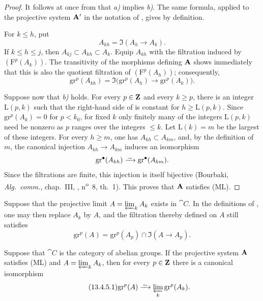 \begin{proof}
It follows at once from  that \emph{a)} implies
\emph{b)}. The same formula, applied to the projective system
$\mathbf{A}'$ in the notation of , gives
 by definition.

For $k\leq h$, put
\[
  A_{kh}=\Im(A_h\longrightarrow A_k).
\]
If $k\leq h\leq j$, then
$A_{kj}\subset A_{kh}\subset A_k$.
Equip $A_{kh}$ with the filtration induced by
$(\mathrm{F}^p(A_k))$.
The transitivity of the morphisms defining $\mathbf{A}$ shows
immediately that this is also the quotient filtration of
$(\mathrm{F}^p(A_h))$; consequently,
\begin{equation}
\label{0.13.4.3.2}
\tag{13.4.3.2}
  \mathrm{gr}^p(A_{kh})
  =
  \Im\bigl(
    \mathrm{gr}^p(A_h)\longrightarrow\mathrm{gr}^p(A_k)
  \bigr).
\end{equation}

Suppose now that \emph{b)} holds.
For every $p\in\mathbf{Z}$ and every $k\geq p$, there is an integer
$\mathrm{L}(p,k)$ such that the right-hand side of
 is constant for $h\geq\mathrm{L}(p,k)$.
Since $\mathrm{gr}^p(A_k)=0$ for $p<k_0$, for fixed $k$ only
finitely many of the integers $\mathrm{L}(p,k)$ need be nonzero as
$p$ ranges over the integers $\leq k$.
Let $\mathrm{L}(k)=m$ be the largest of these integers.
For every $h\geq m$, one has
$A_{kh}\subset A_{km}$, and, by the definition of $m$, the canonical
injection
$A_{kh}\longrightarrow A_{km}$ induces an isomorphism
\[
  \mathrm{gr}^\bullet(A_{kh})
  \simto
  \mathrm{gr}^\bullet(A_{km}).
\]
Since the filtrations are finite, this injection is itself bijective
(Bourbaki, \emph{Alg.\ comm.}, chap.~III, ,
n\textsuperscript{o}~8, th.~1).
This proves that $\mathbf{A}$ satisfies (ML).
\end{proof}

\begin{env}[13.4.4]
\label{0.13.4.4}
Suppose that the projective limit
$A=\varprojlim_k A_k$ exists in $\cat{C}$.
In the definitions of , one may then replace $A_k$ by
$A$, and the filtration thereby defined on $A$ still satisfies
\begin{equation}
\label{0.13.4.4.1}
\tag{13.4.4.1}
  \mathrm{gr}^p(A)
  =
  \mathrm{gr}^p(A_p)
  \cap
  \Im(A\longrightarrow A_p).
\end{equation}
\end{env}

\begin{corollary}[13.4.5]
\label{0.13.4.5}
Suppose that $\cat{C}$ is the category of abelian groups.
If the projective system $\mathbf{A}$ satisfies (ML) and
$A=\varprojlim_k A_k$, then for every $p\in\mathbf{Z}$ there is a
canonical isomorphism
\begin{equation}
\label{0.13.4.5.1}
\tag{13.4.5.1}
  \mathrm{gr}^p(A)
  \isoto
  \varprojlim_k\mathrm{gr}^p(A_k).
\end{equation}
\end{corollary}

